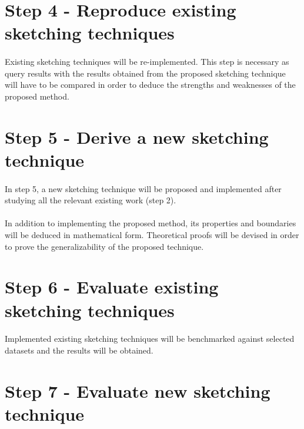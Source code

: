 \section*{Step 4 - Reproduce existing sketching techniques}

\paragraph{}
Existing sketching techniques will be re-implemented. This step is necessary as query results with the results obtained from the proposed sketching technique will have to be compared in order to deduce the strengths and weaknesses of the proposed method. 

\section*{Step 5 - Derive a new sketching technique}

\paragraph{}
In step 5, a new sketching technique will be proposed and implemented after studying all the relevant existing work (step 2). 

\paragraph{}
In addition to implementing the proposed method, its properties and boundaries will be deduced in mathematical form. Theoretical proofs will be devised in order to prove the generalizability of the proposed technique. 

\section*{Step 6 - Evaluate existing sketching techniques}

\paragraph{}
Implemented existing sketching techniques will be benchmarked against selected datasets and the results will be obtained. 

\section*{Step 7 - Evaluate new sketching technique}

